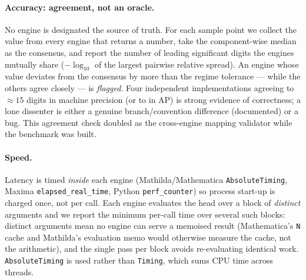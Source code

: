 \documentclass[11pt]{article}
\newcommand{\mcode}[1]{\texttt{\textcolor{mCode}{#1}}}
\begin{document}
\paragraph{Accuracy: agreement, not an oracle.}
No engine is designated the source of truth. For each sample point we collect the value
from every engine that returns a number, take the component-wise median as the consensus,
and report the number of leading significant digits the engines mutually share
($-\log_{10}$ of the largest pairwise relative spread). An engine whose value deviates
from the consensus by more than the regime tolerance --- while the others agree closely ---
is \emph{flagged}. Four independent implementations agreeing to $\approx 15$ digits in
machine precision (or to \sfapdps{} in AP) is strong evidence of correctness; a lone
dissenter is either a genuine branch/convention difference (documented) or a bug. This
agreement check doubled as the cross-engine mapping validator while the benchmark was
built.

\paragraph{Speed.}
Latency is timed \emph{inside} each engine (Mathilda/Mathematica \mcode{AbsoluteTiming},
Maxima \mcode{elapsed\_real\_time}, Python \mcode{perf\_counter}) so process start-up is
charged once, not per call. Each engine evaluates the head over a block of \emph{distinct}
arguments and we report the minimum per-call time over several such blocks: distinct
arguments mean no engine can serve a memoised result (Mathematica's \mcode{N} cache and
Mathilda's evaluation memo would otherwise measure the cache, not the arithmetic), and the
single pass per block avoids re-evaluating identical work. \mcode{AbsoluteTiming} is used
rather than \mcode{Timing}, which sums CPU time across threads.
\end{document}
